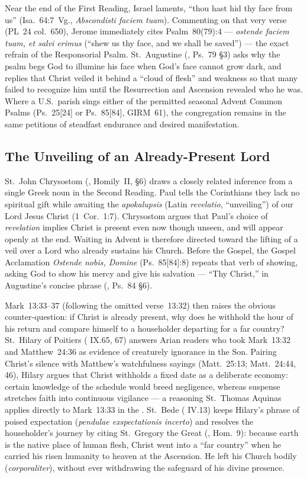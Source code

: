 Near the end of the First Reading, Israel laments, ``thou hast hid thy face from us'' (Isa.~64:7~Vg., \emph{Abscondisti faciem tuam}). Commenting on that very verse (PL~24 col.~650), Jerome immediately cites Psalm~80(79):4 --- \emph{ostende faciem tuam, et salvi erimus} (``shew us thy face, and we shall be saved'') --- the exact refrain of the Responsorial Psalm. St.~Augustine (, Ps.~79 §3) asks why the psalm begs God to illumine his face when God's face cannot grow dark, and replies that Christ veiled it behind a ``cloud of flesh'' and weakness so that many failed to recognize him until the Resurrection and Ascension revealed who he was. Where a U.S.\ parish sings either of the permitted seasonal Advent Common Psalms (Ps.~25[24] or Ps.~85[84], GIRM~61), the congregation remains in the same petitions of steadfast endurance and desired manifestation.

\subsection{The Unveiling of an Already-Present Lord}

St.~John Chrysostom (, Homily~II, §6) draws a closely related inference from a single Greek noun in the Second Reading. Paul tells the Corinthians they lack no spiritual gift while awaiting the \emph{apokalupsis} (Latin \emph{revelatio}, ``unveiling'') of our Lord Jesus Christ (1~Cor.~1:7). Chrysostom argues that Paul's choice of \emph{revelation} implies Christ is present even now though unseen, and will appear openly at the end. Waiting in Advent is therefore directed toward the lifting of a veil over a Lord who already sustains his Church. Before the Gospel, the Gospel Acclamation \emph{Ostende nobis, Domine} (Ps.~85[84]:8) repeats that verb of showing, asking God to show his mercy and give his salvation --- ``Thy Christ,'' in Augustine's concise phrase (, Ps.~84 §6).

Mark~13:33--37 (following the omitted verse~13:32) then raises the obvious counter-question: if Christ is already present, why does he withhold the hour of his return and compare himself to a householder departing for a far country? St.~Hilary of Poitiers ( IX.65, 67) answers Arian readers who took Mark~13:32 and Matthew~24:36 as evidence of creaturely ignorance in the Son. Pairing Christ's silence with Matthew's watchfulness sayings (Matt.~25:13; Matt.~24:44, 46), Hilary argues that Christ withholds a fixed date as a deliberate economy: certain knowledge of the schedule would breed negligence, whereas suspense stretches faith into continuous vigilance --- a reasoning St.~Thomas Aquinas applies directly to Mark~13:33 in the . St.~Bede ( IV.13) keeps Hilary's phrase of poised expectation (\emph{pendulae exspectationis incerto}) and resolves the householder's journey by citing St.~Gregory the Great (, Hom.~9): because earth is the native place of human flesh, Christ went into a ``far country'' when he carried his risen humanity to heaven at the Ascension. He left his Church bodily (\emph{corporaliter}), without ever withdrawing the safeguard of his divine presence.

